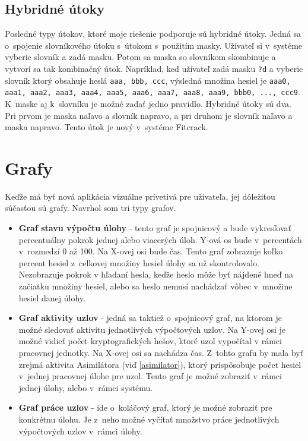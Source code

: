 \documentclass[zadani,slovak]{fitthesis}
\begin{document}
\subsection{Hybridné útoky} \label{hybridAttack}
Posledné typy útokov, ktoré moje riešenie podporuje sú hybridné útoky. Jedná sa o~spojenie slovníkového útoku s~útokom s~použitím masky. Užívateľ si v~systéme vyberie slovník a zadá masku. Potom sa maska so slovníkom skombinuje a vytvorí sa tak kombinačný útok. Napríklad, keď užívateľ zadá masku \texttt{?d} a vyberie slovník ktorý obsahuje heslá \texttt{aaa, bbb, ccc}, výsledná množina hesiel je 
\texttt{aaa0, aaa1, aaa2, aaa3, aaa4, aaa5, aaa6, aaa7, aaa8, aaa9, bbb0, ..., ccc9}. K~maske aj k~slovníku je možné zadať jedno pravidlo. Hybridné útoky sú dva. Pri prvom je maska naľavo a slovník napravo, a pri druhom je slovník naľavo a maska napravo. Tento útok je nový v~systéme Fitcrack.


\section{Grafy}\label{graphs}
Keďže má byť nová aplikácia vizuálne prívetivá pre užívateľa, jej dôležitou súčasťou sú grafy. Navrhol som tri typy grafov.
\begin{itemize}
    \item \textbf{Graf stavu výpočtu úlohy} \label{progressGraph} - tento graf je spojnicový a bude vykresľovať percentuálny pokrok jednej alebo viacerých úloh. Y-ová os bude v~percentách v~rozmedzí 0 až 100. Na X-ovej osi bude čas. Tento graf zobrazuje koľko percent hesiel z~celkovej množiny hesiel úlohy sa už skontrolovalo. Nezobrazuje pokrok v hľadaní hesla, keďže heslo môže byť nájdené hneď na začiatku množiny hesiel, alebo sa heslo nemusí nachádzať vôbec v~množine hesiel danej úlohy.
    \item \textbf{Graf aktivity uzlov} - jedná sa taktiež o~spojnicový graf, na ktorom je možné sledovať aktivitu jednotlivých výpočtových uzlov. Na Y-ovej osi je možné vidieť počet kryptografických hešov, ktoré uzol vypočítal v rámci pracovnej jednotky. Na X-ovej osi sa nachádza čas. Z~tohto grafu by mala byť zrejmá aktivita Asimilátora (viď \ref{asimilator}), ktorý prispôsobuje počet hesiel v~jednej pracovnej úlohe pre uzol. Tento graf je možné zobraziť v~rámci jednej úlohy, alebo v~rámci systému.
    \item \textbf{Graf práce uzlov} - ide o~koláčový graf, ktorý je možné zobraziť pre konkrétnu úlohu. Je z~neho možné vyčítať množstvo práce jednotlivých výpočtových uzlov v~rámci úlohy.
\end{itemize}
\end{document}
